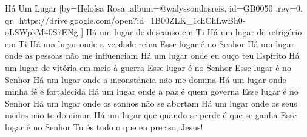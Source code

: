 \beginsong
{Há Um Lugar %
}[by={Heloísa Rosa %
},album={@walyssondosreis},
id={GB0050 %
},rev={0}, %
qr={https://drive.google.com/open?id=1B00ZLK_1chChLwBh0-oLSWpkM40S7ENg %
}]
\beginverse*
Há um lugar de descanso em Ti
Há um lugar de refrigério em Ti
Há um lugar onde a verdade reina
Esse lugar é no Senhor
\endverse
\beginverse*
Há um lugar onde as pessoas não me influenciam
Há um lugar onde eu ouço teu Espírito
Há um lugar de vitória em meio à guerra
Esse lugar é no Senhor
\endverse
\beginchorus
Esse lugar é no Senhor
\endchorus
\beginverse*
Há um lugar onde a inconstância não me domina
Há um lugar onde minha fé é fortalecida
Há um lugar onde a paz é quem governa
Esse lugar é no Senhor
\endverse
\beginverse*
Há um lugar onde os sonhos não se abortam
Há um lugar onde os seus medos não te dominam
Há um lugar que quando se perde é que se ganha
Esse lugar é no Senhor
\endverse
\beginverse*
Tu és tudo o que eu preciso, Jesus!
\endverse
\vspace{4em} %
\begin{comment}
\lstset{basicstyle=\scriptsize\bf} %
\tab{Solo 1}
\begin{lstlisting}
E|-----------------------------------------------------|
B|-----------------------------------------------------|
G|-----------------------------------------------------|
D|-----------------------------------------------------|
A|-----------------------------------------------------|
E|-----------------------------------------------------|
\end{lstlisting}
\end{comment}
 
